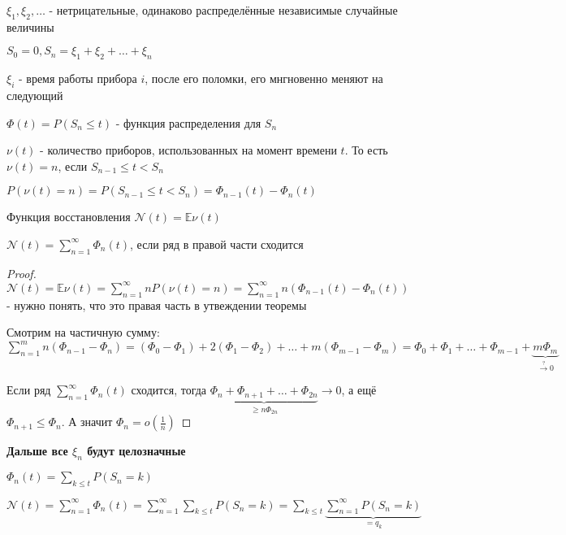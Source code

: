 
\begin{definition}
    $\xi_1, \xi_2, \ldots$ - нетрицательные, одинаково распределённые независимые случайные величины

    $S_0 = 0, S_n = \xi_1 + \xi_2 + \ldots + \xi_n$

    $\xi_i$ - время работы прибора $i$, после его поломки, его мнгновенно меняют на следующий

    $\Phi (t) = P(S_n \leqslant t)$ - функция распределения для $S_n$

    $\nu (t)$ - количество приборов, использованных на момент времени $t$. То есть $\nu (t) = n$, если $S_{n-1} \leqslant t < S_n$

    $P(\nu (t) = n) = P(S_{n - 1} \leqslant t < S_n) = \Phi_{n-1} (t) - \Phi_n (t)$

    Функция восстановления $\mathcal{N} (t) = \mathbb{E} \nu (t)$
\end{definition}

\begin{theorem}
    $\mathcal{N} (t) = \sum\limits_{n = 1}^{\infty} \Phi_n (t)$, если ряд в правой части сходится
\end{theorem}

\begin{proof}
    $\mathcal{N} (t) = \mathbb{E} \nu (t) = \sum\limits_{n = 1}^\infty n P(\nu (t) = n) = \sum\limits_{n = 1}^\infty n (\Phi_{n - 1} (t) - \Phi_n (t))$ - нужно понять, что это правая часть в утвеждении теоремы

    Смотрим на частичную сумму: $\sum\limits_{n = 1}^m n (\Phi_{n - 1} - \Phi_n) = (\Phi_0 - \Phi_1) + 2 (\Phi_1 - \Phi_2) + \ldots + m (\Phi_{m - 1} - \Phi_m) = \Phi_0 + \Phi_1 + \ldots + \Phi_{m-1} + \underbrace{m\Phi_m}_{\overset{?}{\rightarrow} 0}$

    Если ряд $\sum\limits_{n = 1}^\infty \Phi_n (t)$ сходится, тогда $\underbrace{\Phi_n + \Phi_{n+1} + \ldots + \Phi_{2n}}_{\geqslant n \Phi_{2n}} \rightarrow 0$, а ещё $\Phi_{n + 1} \leqslant \Phi_n$. А значит $\Phi_n = o \left( \frac{1}{n} \right)$
\end{proof}

\textbf{Дальше все $\xi_n$ будут целозначные}

\begin{remark}
    $\Phi_n (t) = \sum\limits_{k \leqslant t} P(S_n = k)$

    $\mathcal{N} (t) = \sum\limits_{n=1}^\infty \Phi_n (t) = \sum\limits_{n = 1}^\infty \sum\limits_{k \leqslant t} P(S_n = k) = \sum\limits_{k \leqslant t} \underbrace{\sum\limits_{n = 1}^\infty P(S_n = k)}_{=q_k}$
\end{remark}

